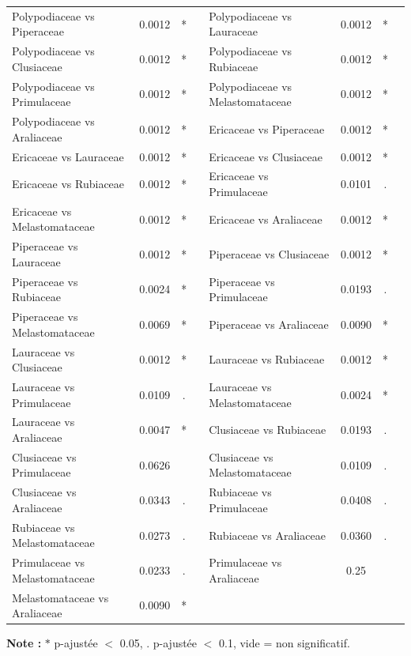 \documentclass[a4paper,12pt]{article}
\begin{document}
\begin{table}[H]
\begin{tabular}{lccc|lccc}
        Polypodiaceae vs Piperaceae & 0.0012 & * & & Polypodiaceae vs Lauraceae & 0.0012 & * \\
        Polypodiaceae vs Clusiaceae & 0.0012 & * & & Polypodiaceae vs Rubiaceae & 0.0012 & * \\
        Polypodiaceae vs Primulaceae & 0.0012 & * & & Polypodiaceae vs Melastomataceae & 0.0012 & * \\
        Polypodiaceae vs Araliaceae & 0.0012 & * & & Ericaceae vs Piperaceae & 0.0012 & * \\
        Ericaceae vs Lauraceae & 0.0012 & * & & Ericaceae vs Clusiaceae & 0.0012 & * \\
        Ericaceae vs Rubiaceae & 0.0012 & * & & Ericaceae vs Primulaceae & 0.0101 & . \\
        Ericaceae vs Melastomataceae & 0.0012 & * & & Ericaceae vs Araliaceae & 0.0012 & * \\
        Piperaceae vs Lauraceae & 0.0012 & * & & Piperaceae vs Clusiaceae & 0.0012 & * \\
        Piperaceae vs Rubiaceae & 0.0024 & * & & Piperaceae vs Primulaceae & 0.0193 & . \\
        Piperaceae vs Melastomataceae & 0.0069 & * & & Piperaceae vs Araliaceae & 0.0090 & * \\
        Lauraceae vs Clusiaceae & 0.0012 & * & & Lauraceae vs Rubiaceae & 0.0012 & * \\
        Lauraceae vs Primulaceae & 0.0109 & . & & Lauraceae vs Melastomataceae & 0.0024 & * \\
        Lauraceae vs Araliaceae & 0.0047 & * & & Clusiaceae vs Rubiaceae & 0.0193 & . \\
        Clusiaceae vs Primulaceae & 0.0626 &  & & Clusiaceae vs Melastomataceae & 0.0109 & . \\
        Clusiaceae vs Araliaceae & 0.0343 & . & & Rubiaceae vs Primulaceae & 0.0408 & . \\
        Rubiaceae vs Melastomataceae & 0.0273 & . & & Rubiaceae vs Araliaceae & 0.0360 & . \\
        Primulaceae vs Melastomataceae & 0.0233 & . & & Primulaceae vs Araliaceae & 0.25 &  \\
        Melastomataceae vs Araliaceae & 0.0090 & * & & & & \\
        \hline
    \end{tabular}
    \begin{flushleft}
    \scriptsize
    \textbf{Note :} $*$ p-ajustée $<$ 0.05, $.$ p-ajustée $<$ 0.1, vide = non significatif.
    \end{flushleft}
\end{table}
\end{document}
